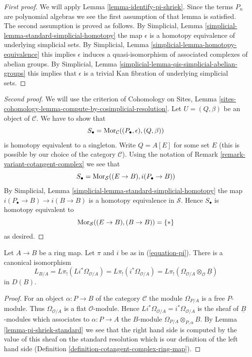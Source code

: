 \begin{proof}[First proof]
We will apply Lemma \ref{lemma-identify-pi-shriek}.
Since the terms $P_n$ are polynomial algebras we see the first
assumption of that lemma is satisfied. The second assumption is proved
as follows. By
Simplicial, Lemma \ref{simplicial-lemma-standard-simplicial-homotopy}
the map $\epsilon$ is a homotopy equivalence of underlying
simplicial sets. By
Simplicial, Lemma \ref{simplicial-lemma-homotopy-equivalence}
this implies $\epsilon$ induces a quasi-isomorphism of associated
complexes of abelian groups. By
Simplicial, Lemma \ref{simplicial-lemma-qis-simplicial-abelian-groups}
this implies that $\epsilon$ is a trivial Kan fibration of underlying
simplicial sets.
\end{proof}

\begin{proof}[Second proof]
We will use the criterion of Cohomology on Sites, Lemma
\ref{sites-cohomology-lemma-compute-by-cosimplicial-resolution}.
Let $U = (Q, \beta)$ be an object of $\mathcal{C}$.
We have to show that
$$
S_\bullet = \mathop{\mathrm{Mor}}\nolimits_\mathcal{C}((P_\bullet, \epsilon), (Q, \beta))
$$
is homotopy equivalent to a singleton. Write $Q = A[E]$ for some set $E$
(this is possible by our choice of the category $\mathcal{C}$). Using the
notation of Remark \ref{remark-variant-cotangent-complex} we see that
$$
S_\bullet = \mathop{\mathrm{Mor}}\nolimits_\mathcal{S}((E \to B), i(P_\bullet \to B))
$$
By Simplicial, Lemma \ref{simplicial-lemma-standard-simplicial-homotopy}
the map $i(P_\bullet \to B) \to i(B \to B)$ is a homotopy equivalence
in $\mathcal{S}$. Hence $S_\bullet$ is homotopy equivalent to
$$
\mathop{\mathrm{Mor}}\nolimits_\mathcal{S}((E \to B), (B \to B)) = \{*\}
$$
as desired.
\end{proof}

\begin{lemma}
\label{lemma-compute-cotangent-complex}
Let $A \to B$ be a ring map.  Let $\pi$ and $i$ be as in (\ref{equation-pi}).
There is a canonical isomorphism
$$
L_{B/A} = L\pi_!(Li^*\Omega_{\mathcal{O}/A}) =
L\pi_!(i^*\Omega_{\mathcal{O}/A}) =
L\pi_!(\Omega_{\mathcal{O}/A} \otimes_\mathcal{O} \underline{B})
$$
in $D(B)$.
\end{lemma}

\begin{proof}
For an object $\alpha : P \to B$ of the category $\mathcal{C}$
the module $\Omega_{P/A}$ is a free $P$-module. Thus
$\Omega_{\mathcal{O}/A}$ is a flat $\mathcal{O}$-module. Hence
$Li^*\Omega_{\mathcal{O}/A} = i^*\Omega_{\mathcal{O}/A}$ is the sheaf
of $\underline{B}$-modules which associates to $\alpha : P \to A$ the
$B$-module $\Omega_{P/A} \otimes_{P, \alpha} B$.
By Lemma \ref{lemma-pi-shriek-standard}
we see that the right hand side is computed by
the value of this sheaf on the standard resolution which is our
definition of the left hand side
(Definition \ref{definition-cotangent-complex-ring-map}).
\end{proof}


